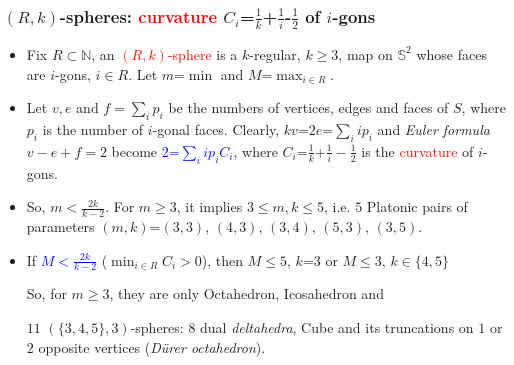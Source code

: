 \documentclass{beamer}
\begin{document}
\begin{frame}\frametitle{$(R,k)$-spheres:  
 \textcolor{red}{curvature} $C_i$=$\frac{1}{k}$+$\frac{1}{i}$-$\frac{1}{2}$
of  $i$-gons}
\vspace{-2mm}
\begin{itemize}
\item Fix $R\subset \mathbb{N}$, an  \textcolor{red}{$(R,k)$-sphere}  is 
a $k$-regular, $k\ge 3$,  map on 
$\mathbb{S}^2$ 
whose faces are $i$-gons,
$i\in R$. Let $m$=$\min$
 and $M$=$\max_{i\in R}$.
 

\item Let $v,e$ and $f=\sum_{i}p_i$ be the numbers of 
vertices, edges and faces of $S$, where $p_i$ is the number 
of $i$-gonal faces. 
Clearly,
$kv$=$2e$=$\sum_{i}ip_i$ and  
 {\em Euler formula $v-e+f=2$}
become   \textcolor{blue}{$2$=$\sum_{i}ip_iC_i$}, where 
$C_i$=$\frac{1}{k}$+$\frac{1}{i}-\frac{1}{2}$ is  
the \textcolor{red}{curvature} of $i$-gons.



\item So, $m$$<$$\frac{2k}{k-2}$.
For $m$$\ge$$3$, 
 it implies $3\le m,k\le 5$,
i.e.  $5$ Platonic pairs of parameters
$(m,k)$=$(3,3)$, $(4,3)$, $(3,4)$, $(5,3)$, $(3,5)$.

\item If \textcolor{blue}{$M$$<$$\frac{2k}{k-2}$} ($\min_{i\in 
R}C_i$$>$$0$),  then
$M$$\le$$5$, $k$=$3$ or $M$$\le$$3$, $k$$\in$$\{4,5\}$

So, for $m\ge 3$, they are only 
Octahedron, 
Icosahedron and 

$11$ $(\{3,4,5\},3)$-spheres: $8$ dual 
 {\em deltahedra}, Cube and its truncations on $1$ or $2$ 
opposite vertices ({\em D\"{u}rer octahedron}).

\end{itemize}\end{frame}
\end{document}
